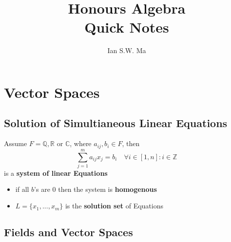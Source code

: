 \documentclass[12pt]{article}
\title{Honours Algebra \\ Quick Notes}
\author{Ian S.W. Ma}
\date{}
\theoremstyle{definition}
\begin{document}
\maketitle

\section{Vector Spaces}

\subsection{Solution of Simultianeous Linear Equations}
Assume \(F = \mathbb{Q},\mathbb{R} \text{ or } \mathbb{C} \), where $a_{ij},b_i \in F$, then
\[
    \sum_{j=1}^m{a_{ij}x_j} = b_i \quad \forall i \in [1,n]:i \in \mathbb{Z}
\]
is a \textbf{system of linear Equations}

\begin{itemize}
    \item if all $b$'s are $0$ then the system is \textbf{homogenous}
    \item $L = \{x_1,...,x_m\}$ is the \textbf{solution set} of Equations
\end{itemize}

\subsection{Fields and Vector Spaces}
\end{document}
